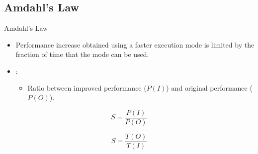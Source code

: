 \subsection{Amdahl's Law}

\begin{frame}[t]{Amdahl's Law}
\begin{itemize}
  \item Performance increase obtained using a faster execution mode
        is limited by the fraction of time that the mode can be used.

  \item {}:
    \begin{itemize}
      \item Ratio between improved performance ($P(I)$) and original performance ($P(O)$).
    \end{itemize}
\end{itemize}

\begin{displaymath}
S = \frac{P(I)}{P(O)}
\end{displaymath}

\begin{displaymath}
S = \frac{T(O)}{T(I)}
\end{displaymath}
\end{frame}


